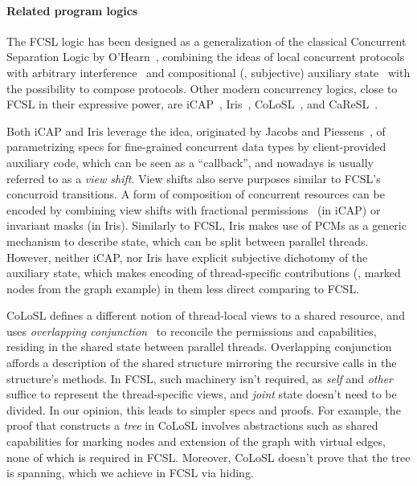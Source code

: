 \paragraph{Related program logics}
\label{sec:relat-logic-fram}

The FCSL logic has been designed as a generalization of the classical
Concurrent Separation Logic by O'Hearn~\cite{OHearn:TCS07}, combining
the ideas of local concurrent protocols with arbitrary
interference~\cite{Jones:TOPLAS83,Feng:POPL09} and compositional (\ie,
subjective) auxiliary state~\cite{LeyWild-Nanevski:POPL13} with the
possibility to compose protocols.
%
Other modern concurrency logics, close to FCSL in their expressive
power, are iCAP~\cite{Svendsen-Birkedal:ESOP14},
Iris~\cite{Jung-al:POPL15}, CoLoSL~\cite{Raad-al:colosl}, and
CaReSL~\cite{Turon-al:ICFP13}.
 
Both iCAP and Iris leverage the idea, originated by Jacobs and
Piessens~\cite{Jacobs-Piessens:POPL11}, of parametrizing specs for
fine-grained concurrent data types by client-provided auxiliary code,
which can be seen as a ``callback'', and nowadays is usually referred
to as a \emph{view shift}. View shifts also serve purposes similar to
FCSL's concurroid transitions. A form of composition of concurrent
resources can be encoded by combining view shifts with fractional
permissions~\cite{Bornat-al:POPL05} (in iCAP) or invariant masks (in
Iris).
%
Similarly to FCSL, Iris makes use of PCMs as a generic mechanism to
describe state, which can be split between parallel threads.
%
However, neither iCAP, nor Iris have explicit subjective dichotomy of
the auxiliary state, which makes encoding of thread-specific
contributions (\eg, marked nodes from the graph example) in them less
direct comparing to FCSL.

CoLoSL defines a different notion of thread-local views to a shared
resource, and uses \emph{overlapping
  conjunction}~\cite{Hobor-Villard:POPL13} to reconcile the
permissions and capabilities, residing in the shared state between
parallel threads.
%
Overlapping conjunction affords a description of the shared structure
mirroring the recursive calls in the structure's methods. In FCSL,
such machinery isn't required, as \emph{self} and \emph{other} suffice
to represent the thread-specific views, and \emph{joint} state doesn't
need to be divided.
%
In our opinion, this leads to simpler specs and proofs.
%
For example, the proof that  constructs a \emph{tree} in
CoLoSL involves abstractions such as shared capabilities for marking
nodes and extension of the graph with virtual edges, none of which is
required in FCSL.
%
Moreover, CoLoSL doesn't prove that the tree is spanning, which we
achieve in FCSL via hiding.

